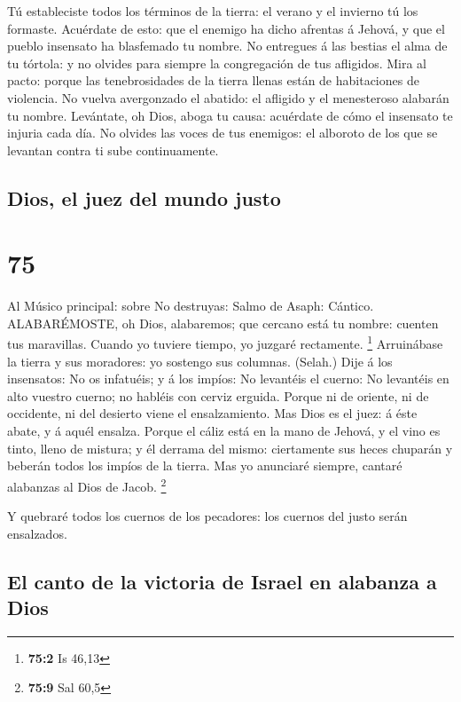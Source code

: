  Tú estableciste todos los términos de la tierra: el verano
y el invierno tú los formaste.  Acuérdate de esto: que el
enemigo ha dicho afrentas á Jehová, y que el pueblo insensato ha
blasfemado tu nombre.  No entregues á las bestias el alma
de tu tórtola: y no olvides para siempre la congregación de tus
afligidos.  Mira al pacto: porque las tenebrosidades de la
tierra llenas están de habitaciones de violencia.  No
vuelva avergonzado el abatido: el afligido y el menesteroso alabarán tu
nombre.  Levántate, oh Dios, aboga tu causa: acuérdate de
cómo el insensato te injuria cada día.  No olvides las
voces de tus enemigos: el alboroto de los que se levantan contra ti sube
continuamente.

\hypertarget{dios-el-juez-del-mundo-justo}{%
\subsection{Dios, el juez del mundo
justo}\label{dios-el-juez-del-mundo-justo}}

\hypertarget{section-74}{%
\section{75}\label{section-74}}

 Al Músico principal: sobre No destruyas: Salmo de Asaph:
Cántico. ALABARÉMOSTE, oh Dios, alabaremos; que cercano está tu nombre:
cuenten tus maravillas.  Cuando yo tuviere tiempo, yo
juzgaré rectamente. \footnote{\textbf{75:2} Is 46,13} 
Arruinábase la tierra y sus moradores: yo sostengo sus columnas.
(Selah.)  Dije á los insensatos: No os infatuéis; y á los
impíos: No levantéis el cuerno:  No levantéis en alto
vuestro cuerno; no habléis con cerviz erguida.  Porque ni de
oriente, ni de occidente, ni del desierto viene el ensalzamiento.
 Mas Dios es el juez: á éste abate, y á aquél ensalza.
 Porque el cáliz está en la mano de Jehová, y el vino es
tinto, lleno de mistura; y él derrama del mismo: ciertamente sus heces
chuparán y beberán todos los impíos de la tierra.  Mas yo
anunciaré siempre, cantaré alabanzas al Dios de Jacob. \footnote{\textbf{75:9}
  Sal 60,5}

 Y quebraré todos los cuernos de los pecadores: los cuernos
del justo serán ensalzados.

\hypertarget{el-canto-de-la-victoria-de-israel-en-alabanza-a-dios}{%
\subsection{El canto de la victoria de Israel en alabanza a
Dios}\label{el-canto-de-la-victoria-de-israel-en-alabanza-a-dios}}

